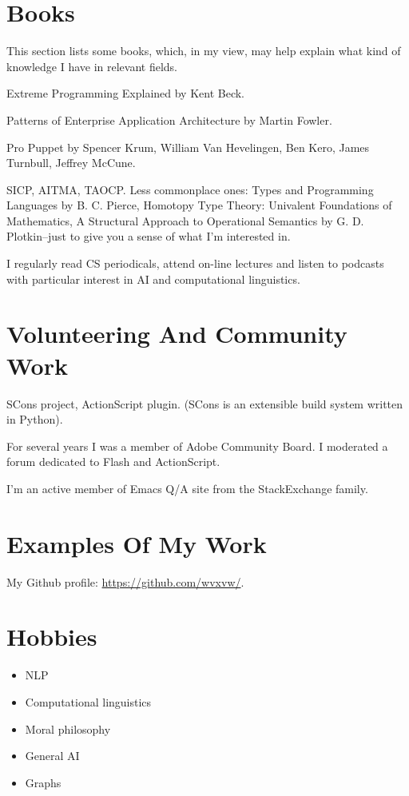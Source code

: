 \documentclass[11pt]{article}
\begin{document}
\section{Books}
\label{sec:orgheadline14}
This section lists some books, which, in my view, may help explain what kind
of knowledge I have in relevant fields.

\begin{description}
\item[{agile programming}] Extreme Programming Explained by Kent Beck.
\item[{software architecture}] Patterns of Enterprise Application Architecture by
Martin Fowler.
\item[{development and operations}] Pro Puppet by Spencer Krum, William Van
Hevelingen, Ben Kero, James Turnbull, Jeffrey McCune.
\item[{general computer science}] SICP, AITMA, TAOCP.  Less commonplace ones:
Types and Programming Languages by B. C. Pierce, Homotopy Type Theory:
Univalent Foundations of Mathematics, A Structural Approach to
Operational Semantics by G. D. Plotkin--just to give you a sense of what
I'm interested in.
\item I regularly read CS periodicals, attend on-line lectures and listen to
podcasts with particular interest in AI and computational linguistics.
\end{description}

\section{Volunteering And Community Work}
\label{sec:orgheadline15}
SCons project, ActionScript plugin.  (SCons is an extensible build system
written in Python).

For several years I was a member of Adobe Community Board.  I moderated a
forum dedicated to Flash and ActionScript.

I'm an active member of Emacs Q/A site from the StackExchange family.

\section{Examples Of My Work}
\label{sec:orgheadline16}
My Github profile:
\url{https://github.com/wvxvw/}.

\section{Hobbies}
\label{sec:orgheadline17}
\begin{itemize}
\item NLP
\item Computational linguistics
\item Moral philosophy
\item General AI
\item Graphs
\end{itemize}
\end{document}
